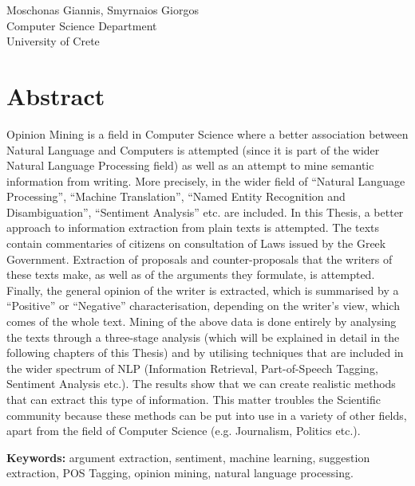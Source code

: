 Moschonas Giannis, Smyrnaios Giorgos\\
Computer Science Department\\
University of Crete \setlength{\parskip}{0.5cm}

\thispagestyle{plain}			%
\setlength{\parskip}{0pt plus 1.0pt}
\section*{Abstract}
Opinion Mining is a field in Computer Science where a better association between Natural Language and Computers is attempted (since it is part of the wider Natural Language Processing field) as well as an attempt to mine semantic information from writing. More precisely, in the wider field of ``Natural Language Processing'', ``Machine Translation'', ``Named Entity Recognition and Disambiguation'', ``Sentiment Analysis'' etc. are included. In this Thesis, a better approach to information extraction from plain texts is attempted. The texts contain commentaries of citizens on consultation of Laws issued by the Greek Government. Extraction of proposals and counter-proposals that the writers of these texts make, as well as of the arguments they formulate, is attempted. Finally, the general opinion of the writer is extracted, which is summarised by a ``Positive'' or ``Negative'' characterisation, depending on  the writer's view, which comes of the whole text. Mining of the above data is done entirely by analysing the texts through a three-stage analysis (which will be explained in detail in the following chapters of this Thesis) and by utilising techniques that are included in the wider spectrum of NLP (Information Retrieval, Part-of-Speech Tagging, Sentiment Analysis etc.). The results show that we can create realistic methods that can extract this type of information. This matter troubles the Scientific community because these methods can be put into use in a variety of other fields, apart from the field of Computer Science (e.g. Journalism, Politics etc.).





\vfill
\textbf{Keywords:} argument extraction, sentiment, machine learning, suggestion extraction, POS Tagging, opinion mining, natural language processing.
